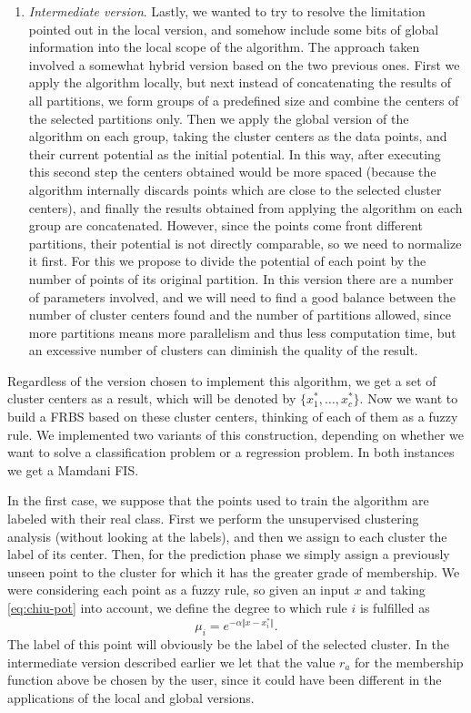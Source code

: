 \begin{enumerate}[1.]
\item \textit{Intermediate version}. Lastly, we wanted to try to resolve the limitation pointed out in the local version, and somehow include some bits of global information into the local scope of the algorithm. The approach taken involved a somewhat hybrid version based on the two previous ones. First we apply the algorithm locally, but next instead of concatenating the results of all partitions, we form groups of a predefined size and combine the centers of the selected partitions only. Then we apply the global version of the algorithm on each group, taking the cluster centers as the data points, and their current potential as the initial potential. In this way, after executing this second step the centers obtained would be more spaced (because the algorithm internally discards points which are close to the selected cluster centers), and finally the results obtained from applying the algorithm on each group are concatenated. However, since the points come front different partitions, their potential is not directly comparable, so we need to normalize it first. For this we propose to divide the potential of each point by the number of points of its original partition. In this version there are a number of parameters involved, and we will need to find a good balance between the number of cluster centers found and the number of partitions allowed, since more partitions means more parallelism and thus less computation time, but an excessive number of clusters can diminish the quality of the result.
\end{enumerate}

Regardless of the version chosen to implement this algorithm, we get a set of cluster centers as a result, which will be denoted by $\{x_1^\ast, \dots, x_c^\ast \}$. Now we want to build a FRBS based on these cluster centers, thinking of each of them as a fuzzy rule. We implemented two variants of this construction, depending on whether we want to solve a classification problem or a regression problem. In both instances we get a Mamdani FIS.

In the first case, we suppose that the points used to train the algorithm are labeled with their real class. First we perform the unsupervised clustering analysis (without looking at the labels), and then we assign to each cluster the label of its center. Then, for the prediction phase we simply assign a previously unseen point to the cluster for which it has the greater grade of membership. We were considering each point as a fuzzy rule, so given an input $x$ and taking \eqref{eq:chiu-pot} into account, we define the degree to which rule $i$ is fulfilled as
\[
\mu_i = e^{-\alpha \Vert x - x_i^\ast \Vert}.
\]
The label of this point will obviously be the label of the selected cluster. In the intermediate version described earlier we let that the value $r_a$ for the membership function above be chosen by the user, since it could have been different in the applications of the local and global versions.

